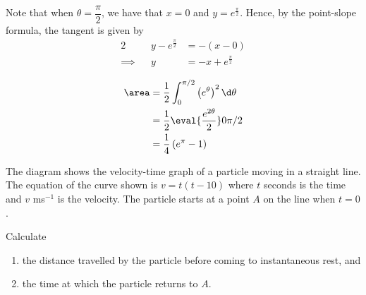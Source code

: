 \documentclass{jhwhw}
\begin{document}
        Note that when $\theta = \dfrac\pi2$, we have that $x = 0$ and $y = e^{\tfrac\pi2}$. Hence, by the point-slope formula, the tangent is given by
        \begin{alignat*}{2}
            &&y - e^{\tfrac\pi2} &= -(x - 0)\\
            \implies&&y &= -x + e^{\tfrac\pi2}
        \end{alignat*}


        \begin{align*}
            \area &= \dfrac12 \int_0^{\pi/2} \left(e^\theta\right)^2 \d \theta\\
            &= \dfrac12 \eval{\dfrac{e^{2\theta}}2}0{\pi/2}\\
            &= \dfrac14 \left(e^\pi - 1\right)
        \end{align*}

    \problem{}
        \begin{center}
        \end{center}
        The diagram shows the velocity-time graph of a particle moving in a straight line. The equation of the curve shown is $v = t(t - 10)$ where $t$ seconds is the time and $v$ ms$^{-1}$ is the velocity. The particle starts at a point $A$ on the line when $t = 0$.

        Calculate
        \begin{enumerate}
            \item the distance travelled by the particle before coming to instantaneous rest, and
            \item the time at which the particle returns to $A$.
        \end{enumerate}
\end{document}
